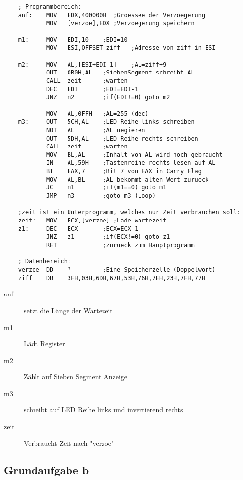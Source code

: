\documentclass[a4paper,12pt,titlepage]{scrartcl}
\begin{document}
\begin{lstlisting}
    ; Programmbereich:
    anf:    MOV   EDX,400000H  ;Groessee der Verzoegerung
            MOV   [verzoe],EDX ;Verzoegerung speichern
    
    m1:     MOV   EDI,10    ;EDI=10
            MOV   ESI,OFFSET ziff   ;Adresse von ziff in ESI
    
    m2:     MOV   AL,[ESI+EDI-1]    ;AL=ziff+9
            OUT   0B0H,AL   ;SiebenSegment schreibt AL
            CALL  zeit      ;warten
            DEC   EDI       ;EDI=EDI-1
            JNZ   m2        ;if(EDI!=0) goto m2
    
            MOV   AL,0FFH   ;AL=255 (dec)
    m3:     OUT   5CH,AL    ;LED Reihe links schreiben
            NOT   AL        ;AL negieren
            OUT   5DH,AL    ;LED Reihe rechts schreiben
            CALL  zeit      ;warten
            MOV   BL,AL     ;Inhalt von AL wird noch gebraucht
            IN    AL,59H    ;Tastenreihe rechts lesen auf AL
            BT    EAX,7     ;Bit 7 von EAX in Carry Flag
            MOV   AL,BL     ;AL bekommt alten Wert zurueck
            JC    m1        ;if(m1==0) goto m1
            JMP   m3        ;goto m3 (Loop)
    
    ;zeit ist ein Unterprogramm, welches nur Zeit verbrauchen soll:
    zeit:   MOV   ECX,[verzoe] ;Lade wartezeit
    z1:     DEC   ECX       ;ECX=ECX-1
            JNZ   z1        ;if(ECX!=0) goto z1
            RET             ;zurueck zum Hauptprogramm
    
    ; Datenbereich:
    verzoe  DD    ?         ;Eine Speicherzelle (Doppelwort)
    ziff    DB    3FH,03H,6DH,67H,53H,76H,7EH,23H,7FH,77H
    \end{lstlisting}
    
    \begin{description}
        \item[anf] setzt die Länge der Wartezeit
        \item[m1] Lädt Register
        \item[m2] Zählt auf Sieben Segment Anzeige
        \item[m3] schreibt auf LED Reihe links und invertierend rechts
        \item[zeit] Verbraucht Zeit nach "verzoe"     
    \end{description}

\subsection*{Grundaufgabe b}
\end{document}

